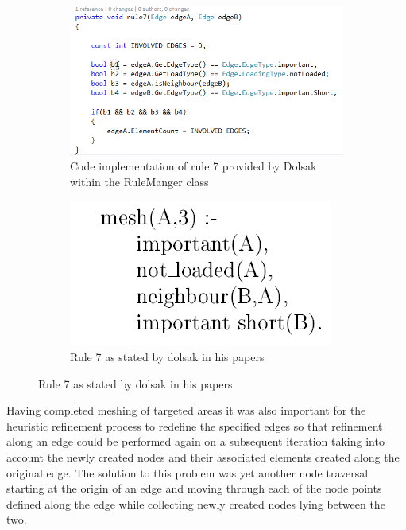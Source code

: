 \begin{figure}[H]
\centering
\begin{subfigure}{.5\textwidth}
  \centering
  \includegraphics[width=0.9\linewidth]{../Graphics/Rule7Implementation.png}
  \caption{Code implementation of rule 7 provided by Dolsak within the RuleManger class}
  \label{fig:sub1}
\end{subfigure}%
\begin{subfigure}{.5\textwidth}
  \centering
  \includegraphics[width=0.7\linewidth]{../Graphics/Rule7Dolsak.png}
  \caption{Rule 7 as stated by dolsak in his papers \cite{appOfILPToFEMeshDesign}}
  \label{fig:sub2}
\end{subfigure}
\label{fig:test}
\end{figure}

\noindent
Having completed meshing of targeted areas it was also important for the heuristic refinement process to redefine the specified edges so that refinement along an edge could be performed again on a subsequent iteration taking into account the newly created nodes and their associated elements created along the original edge. The solution to this problem was yet another node traversal starting at the origin of an edge and moving through each of the node points defined along the edge while collecting newly created nodes lying between the two. \\


